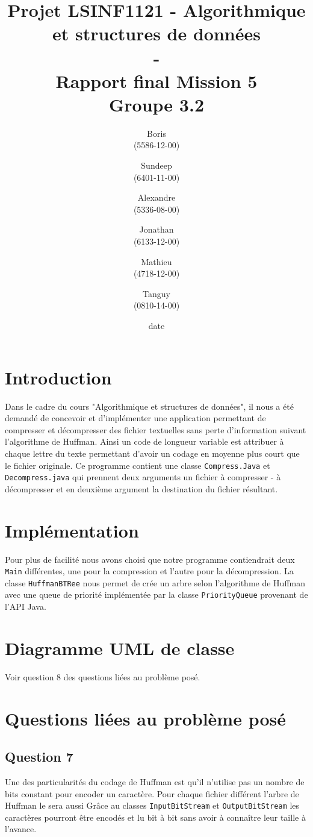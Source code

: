 \documentclass[11pt]{article}
\title{\textbf{Projet LSINF1121 -  Algorithmique et structures de données\\ - \\ Rapport final Mission 5} \\ {\large Groupe 3.2}}
\author{Boris \bsc{Dehem} \\(5586-12-00)\and Sundeep \bsc{Dhillon} \\(6401-11-00)\and Alexandre \bsc{Hauet} \\ (5336-08-00) \and Jonathan \bsc{Powell}\\(6133-12-00)\and Mathieu \bsc{Rosar} \\ (4718-12-00)\and Tanguy \bsc{Vaessen} \\ (0810-14-00)}
\date{date}
\date{\vspace*{25mm}
\texttt{[image: logo.jpg]}\\
		\vspace*{30mm}
		\begin{center}
		Année académique 2014-2015 \\	
		\end{center}}
\begin{document}
\thispagestyle{empty}

\maketitle
\thispagestyle{empty}
\setcounter{tocdepth}{3}

\newpage
\setcounter{page}{1}

\section*{Introduction}

Dans le cadre du cours "Algorithmique et structures de données", il nous a été demandé de concevoir et d'implémenter une application permettant de compresser et décompresser des fichier textuelles sans perte d'information suivant l'algorithme de Huffman. Ainsi un code de longueur variable est attribuer à chaque lettre du texte permettant d'avoir un codage en moyenne plus court que le fichier originale. Ce programme contient une classe \verb+Compress.Java+ et \verb+Decompress.java+ qui prennent deux arguments un fichier à compresser - à décompresser et en deuxième argument la destination du fichier résultant.

\section{Implémentation}
Pour plus de facilité nous avons choisi que notre programme contiendrait deux \verb+Main+ différentes, une pour la compression et l'autre pour la décompression.
La classe \verb+HuffmanBTRee+ nous permet de crée un arbre selon l'algorithme de Huffman avec une queue de priorité implémentée par la classe \verb+PriorityQueue+ provenant de l'API Java.

\section{Diagramme UML de classe}
Voir question 8 des questions liées au problème posé.

\section{Questions liées au problème posé}

\subsection*{Question 7}
Une des particularités du codage de Huffman est qu'il n'utilise pas un nombre de bits constant pour encoder un caractère. Pour chaque fichier différent l'arbre de Huffman le sera aussi Grâce au classes \verb+InputBitStream+ et \verb+OutputBitStream+ les caractères pourront être encodés et lu bit à bit sans avoir à connaître leur taille à l'avance.
\end{document}
